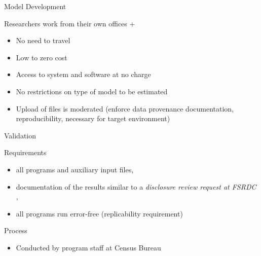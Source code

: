 \begin{frame}{Model Development}
	\scalebox{0.1}{\myworkflow}
	\begin{block}{Researchers work from their own offices $+$}
		\begin{itemize}
			\item No need to travel
			\item Low to zero cost
			\item Access to system and software at no charge
			\item No restrictions on type of model to be estimated
            \item Upload of files is moderated (enforce data provenance documentation, reproducibility, necessary for target environment)
		\end{itemize}
	\end{block}
	
\end{frame}




\begin{frame}{Validation}
\scalebox{0.1}{\myworkflow}
\scalebox{0.6}{
\flowvalidation{}
}

\begin{block}{Requirements}
\begin{itemize}
			\item all programs and auxiliary input files, 
			\item documentation of the results similar to a		{\it \color{orange}	disclosure review request at \ac{FSRDC}} , 
			\item all programs run error-free	(replicability requirement)
		\end{itemize}
\end{block}

\begin{block}{Process}
\begin{itemize}
			\item Conducted by program staff at Census Bureau
		\end{itemize}
\end{block}

\end{frame}





